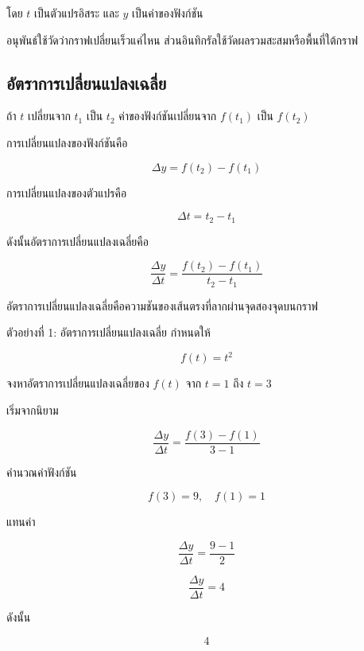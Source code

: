 โดย $t$ เป็นตัวแปรอิสระ และ $y$ เป็นค่าของฟังก์ชัน

\begin{tcolorbox}[title=แนวคิดสำคัญ]
อนุพันธ์ใช้วัดว่ากราฟเปลี่ยนเร็วแค่ไหน ส่วนอินทิกรัลใช้วัดผลรวมสะสมหรือพื้นที่ใต้กราฟ
\end{tcolorbox}

\subsection{อัตราการเปลี่ยนแปลงเฉลี่ย}

ถ้า $t$ เปลี่ยนจาก $t_1$ เป็น $t_2$ ค่าของฟังก์ชันเปลี่ยนจาก $f(t_1)$ เป็น $f(t_2)$

การเปลี่ยนแปลงของฟังก์ชันคือ

\[
\Delta y=f(t_2)-f(t_1)
\]

การเปลี่ยนแปลงของตัวแปรคือ

\[
\Delta t=t_2-t_1
\]

ดังนั้นอัตราการเปลี่ยนแปลงเฉลี่ยคือ

\[
\frac{\Delta y}{\Delta t}
=
\frac{f(t_2)-f(t_1)}{t_2-t_1}
\]

\begin{tcolorbox}[title=ความหมายบนกราฟ]
อัตราการเปลี่ยนแปลงเฉลี่ยคือความชันของเส้นตรงที่ลากผ่านจุดสองจุดบนกราฟ
\end{tcolorbox}

\begin{center}
\end{center}

\begin{examplebox}{ตัวอย่างที่ 1: อัตราการเปลี่ยนแปลงเฉลี่ย}
กำหนดให้

\[
f(t)=t^2
\]

จงหาอัตราการเปลี่ยนแปลงเฉลี่ยของ $f(t)$ จาก $t=1$ ถึง $t=3$

เริ่มจากนิยาม

\[
\frac{\Delta y}{\Delta t}
=
\frac{f(3)-f(1)}{3-1}
\]

คำนวณค่าฟังก์ชัน

\[
f(3)=9,\quad f(1)=1
\]

แทนค่า

\[
\frac{\Delta y}{\Delta t}
=
\frac{9-1}{2}
\]

\[
\frac{\Delta y}{\Delta t}=4
\]

ดังนั้น

\[
\boxed{4}
\]
\end{examplebox}

